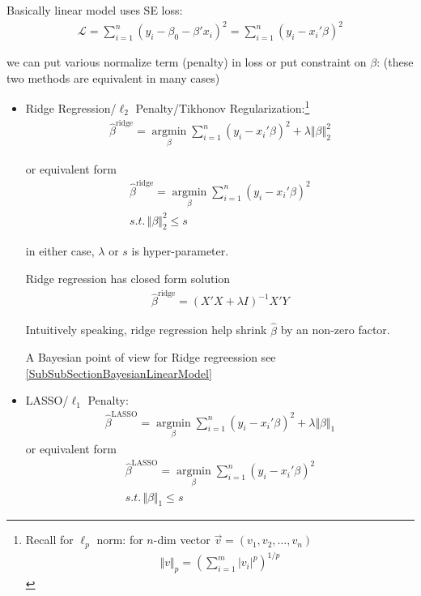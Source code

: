     Basically linear model uses SE loss:
    \begin{align}
        \mathcal{L}=\sum_{i=1}^n(y_i-\beta _0-\beta 'x_i)^2=\sum_{i=1}^n(y_i-x_i'\beta )^2
    \end{align}

    we can put various normalize term (penalty) in loss or put constraint on $ \beta  $: (these two methods are equivalent in many cases)
    \begin{itemize}[topsep=2pt,itemsep=0pt]
        \item {}Ridge Regression/$ \ell_2 $ Penalty/Tikhonov Regularization:\footnote{Recall for $ \ell_p $ norm: for $ n $-dim vector $ \vec{v}=(v_{1},v_{2},\ldots,v_{n})  $
        \begin{align}
             \Vert v \Vert_p=\left(\sum_{i=1}^m|v_i|^p\right)^{1/p} 
        \end{align}
        
        }
        \begin{align}
            \hat{\beta }^\mathrm{ridge}=\mathop{\arg\min}\limits_{\beta } \sum_{i=1}^n(y_i-x_i'\beta )^2+ \lambda \Vert \beta  \Vert _2^2 
        \end{align}

        or equivalent form 
        \begin{align}
            \hat{\beta }^\mathrm{ridge}=\mathop{\arg\min}\limits_{\beta } \sum_{i=1}^n(y_i-x_i'\beta )^2 \\
            s.t.\,\Vert \beta  \Vert _2^2\leq s
        \end{align}
        
        in either case, $ \lambda  $ or $ s $ is hyper-parameter.

        Ridge regression has closed form solution
        \begin{align}
            \hat{\beta }^\mathrm{ridge}=(X'X+\lambda I)^{-1}X'Y  
        \end{align}

        Intuitively speaking, ridge regression help shrink $ \hat{\beta } $ by an non-zero factor.

        A Bayesian point of view for Ridge regreession see \autoref{SubSubSectionBayesianLinearModel}
        
        \item LASSO/$ \ell_1 $ Penalty:
        \begin{align}
            \hat{\beta }^\mathrm{LASSO}=\mathop{\arg\min}\limits_{\beta } \sum_{i=1}^n(y_i-x_i'\beta )^2+ \lambda \Vert \beta  \Vert _1 
        \end{align}
        or equivalent form 
        \begin{align}
            \hat{\beta }^\mathrm{LASSO}=\mathop{\arg\min}\limits_{\beta } \sum_{i=1}^n(y_i-x_i'\beta )^2 \\
            s.t.\,\Vert \beta  \Vert _1\leq s
        \end{align}


\end{itemize}
